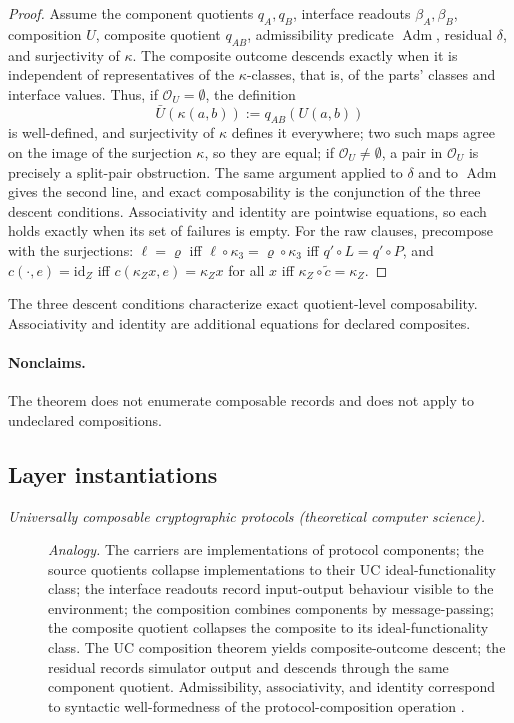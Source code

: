 \begin{proof}
Assume the component quotients \(q_A,q_B\), interface readouts
\(\beta_A,\beta_B\), composition \(U\), composite quotient
\(q_{AB}\), admissibility predicate \(\operatorname{Adm}\), residual
\(\delta\), and surjectivity of \(\kappa\).  The composite outcome
descends exactly when it is independent of representatives of the
\(\kappa\)-classes, that is, of the parts' classes and interface values.
Thus, if \(\mathcal O_U=\emptyset\), the definition
\[
  \bar U(\kappa(a,b)):=q_{AB}(U(a,b))
\]
is well-defined, and surjectivity of \(\kappa\) defines it everywhere; two such maps agree on the image of the surjection \(\kappa\), so they are equal;
if \(\mathcal O_U\ne\emptyset\), a pair in \(\mathcal O_U\) is precisely
a split-pair obstruction.  The same argument applied to \(\delta\) and
to \(\operatorname{Adm}\) gives the second line, and exact
composability is the conjunction of the three descent conditions.
Associativity and identity are pointwise equations, so each holds
exactly when its set of failures is empty. For the raw clauses, precompose with the surjections: \(\ell=\varrho\) iff \(\ell\circ\kappa_3=\varrho\circ\kappa_3\) iff \(q'\circ L=q'\circ P\), and \(c(\cdot,e)=\mathrm{id}_Z\) iff \(c(\kappa_Z x,e)=\kappa_Z x\) for all \(x\) iff \(\kappa_Z\circ\tilde c=\kappa_Z\).
\end{proof}

The three descent conditions characterize exact quotient-level
composability. Associativity and identity are additional equations for
declared composites.

\paragraph{Nonclaims.} The theorem does not enumerate composable records and does not apply
to undeclared compositions.

\subsection*{Layer instantiations}\label{layer-inst:F28}

\begingroup\small
\begin{description}
\item[\emph{Universally composable cryptographic
protocols (theoretical computer science).}] \textit{Analogy.}
The carriers are implementations of protocol components;
the source quotients collapse implementations to their
UC ideal-functionality class; the interface readouts
record input-output behaviour visible to the
environment; the composition combines components by
message-passing; the composite quotient collapses the
composite to its ideal-functionality class.  The UC
composition theorem yields composite-outcome descent;
the residual records simulator output and descends
through the same component quotient.  Admissibility,
associativity, and identity correspond to syntactic
well-formedness of the protocol-composition operation
\citep{Canetti2001UC}.

\end{description}
\endgroup


